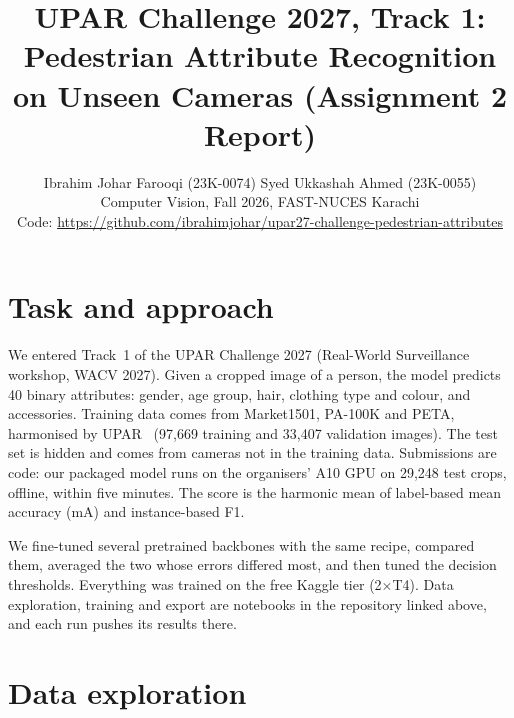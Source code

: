 \documentclass[10pt,twocolumn,letterpaper]{article}
\begin{document}
\title{UPAR Challenge 2027, Track 1: Pedestrian Attribute Recognition\\on Unseen Cameras (Assignment 2 Report)}

\author{Ibrahim Johar Farooqi (23K-0074) \qquad Syed Ukkashah Ahmed (23K-0055)\\
Computer Vision, Fall 2026, FAST-NUCES Karachi\\
{\small Code: \url{https://github.com/ibrahimjohar/upar27-challenge-pedestrian-attributes}}
}

\maketitle

\section{Task and approach}

We entered Track~1 of the UPAR Challenge 2027 (Real-World Surveillance workshop, WACV 2027). Given a cropped image of a person, the model predicts 40 binary attributes: gender, age group, hair, clothing type and colour, and accessories. Training data comes from Market1501, PA-100K and PETA, harmonised by UPAR~\cite{specker2023upar,cormier2023challenge} (97{,}669 training and 33{,}407 validation images). The test set is hidden and comes from cameras not in the training data. Submissions are code: our packaged model runs on the organisers' A10 GPU on 29{,}248 test crops, offline, within five minutes. The score is the harmonic mean of label-based mean accuracy (mA) and instance-based F1.

We fine-tuned several pretrained backbones with the same recipe, compared them, averaged the two whose errors differed most, and then tuned the decision thresholds. Everything was trained on the free Kaggle tier (2$\times$T4). Data exploration, training and export are notebooks in the repository linked above, and each run pushes its results there.

\section{Data exploration}
\end{document}
